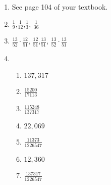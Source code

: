 \documentclass[12pt]{article}
\begin{document}
\begin{enumerate}
\item See page 104 of your textbook.
\item $\frac{1}{9}$,\quad $\frac{1}{12}$,\quad $\frac{1}{3}$,
\quad $\frac{1}{36}$
\item $\frac{13}{52}\cdot\frac{12}{51}$,\quad
$\frac{12}{51}$,\quad $\frac{13}{51}$,\quad
$\frac{13}{52}\cdot\frac{13}{51}$
\item\begin{enumerate}
\item $137,317$
\item $\frac{15200}{17113}$
\item $\frac{115248}{137317}$
\item $22,069$
\item $\frac{11373}{1226547}$
\item $12,360$
\item $\frac{137317}{1226547}$
\end{enumerate}
\end{enumerate}
\end{document}
